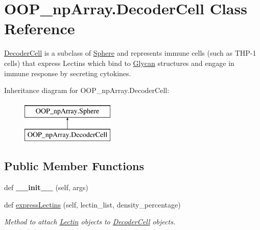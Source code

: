 \hypertarget{class_o_o_p__np_array_1_1_decoder_cell}{}\section{O\+O\+P\+\_\+np\+Array.\+Decoder\+Cell Class Reference}
\label{class_o_o_p__np_array_1_1_decoder_cell}


\mbox{\hyperlink{class_o_o_p__np_array_1_1_decoder_cell}{Decoder\+Cell}} is a subclass of \mbox{\hyperlink{class_o_o_p__np_array_1_1_sphere}{Sphere}} and represents immune cells (such as T\+H\+P-\/1 cells) that express Lectins which bind to \mbox{\hyperlink{class_o_o_p__np_array_1_1_glycan}{Glycan}} structures and engage in immune response by secreting cytokines.  


Inheritance diagram for O\+O\+P\+\_\+np\+Array.\+Decoder\+Cell\+:\begin{figure}[H]
\begin{center}
\leavevmode
\includegraphics[height=2.000000cm]{class_o_o_p__np_array_1_1_decoder_cell}
\end{center}
\end{figure}
\subsection*{Public Member Functions}
\begin{DoxyCompactItemize}
\item 
\mbox{\label{class_o_o_p__np_array_1_1_decoder_cell_af7cfba9c006d9b79594cebd2d583dd99}} 
def {\bfseries \+\_\+\+\_\+init\+\_\+\+\_\+} (self, args)
\item 
def \mbox{\hyperlink{class_o_o_p__np_array_1_1_decoder_cell_a91863318471abedb0cd6db43b22a4ece}{express\+Lectins}} (self, lectin\+\_\+list, density\+\_\+percentage)
\begin{DoxyCompactList}\small\item\em Method to attach \mbox{\hyperlink{class_o_o_p__np_array_1_1_lectin}{Lectin}} objects to \mbox{\hyperlink{class_o_o_p__np_array_1_1_decoder_cell}{Decoder\+Cell}} objects. \end{DoxyCompactList}\end{DoxyCompactItemize}

